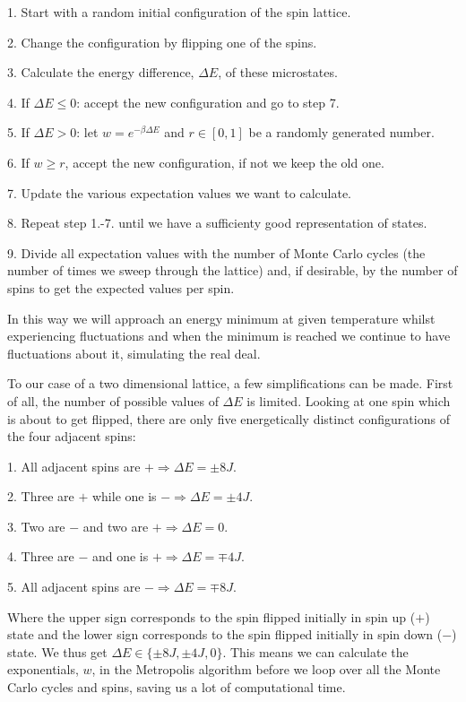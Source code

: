 \documentclass[english, 12pt]{article}
\begin{document}
1. Start with a random initial configuration of the spin lattice.

2. Change the configuration by flipping one of the spins.

3. Calculate the energy difference, $\Delta E$, of these microstates.

4. If $\Delta E\leq 0$: accept the new configuration and go to step 7.

5. If $\Delta E>0$: let $w = e^{-\beta\Delta E}$ and $r\in[0,1]$ be a randomly generated number.

6. If $w\geq r$, accept the new configuration, if not we keep the old one.

7. Update the various expectation values we want to calculate.

8. Repeat step 1.-7. until we have a sufficienty good representation of states.

9. Divide all expectation values with the number of Monte Carlo cycles (the number of times we sweep through the lattice) and, if desirable, by the number of spins to get the expected values per spin.

In this way we will approach an energy minimum at given temperature whilst experiencing fluctuations and when the minimum is reached we continue to have fluctuations about it, simulating the real deal.

To our case of a two dimensional lattice, a few simplifications can be made. First of all, the number of possible values of $\Delta E$ is limited. Looking at one spin which is about to get flipped, there are only five energetically distinct configurations of the four adjacent spins:

1. All adjacent spins are $+ \Rightarrow \Delta E = \pm8J$. 

2. Three are $+$ while one is $- \Rightarrow \Delta E = \pm 4J$. 

3. Two are $-$ and two are $+ \Rightarrow \Delta E = 0$. 

4. Three are $-$ and one is $+ \Rightarrow \Delta E = \mp 4J$. 

5. All adjacent spins are $- \Rightarrow \Delta E = \mp 8J$.

Where the upper sign corresponds to the spin flipped initially in spin up ($+$) state and the lower sign corresponds to the spin flipped initially in spin down ($-$) state.
We thus get  $\Delta E\in\{\pm8J, \pm4J, 0\}$. This means we can calculate the exponentials, $w$, in the Metropolis algorithm before we loop over all the Monte Carlo cycles and spins, saving us a lot of computational time.
\end{document}
